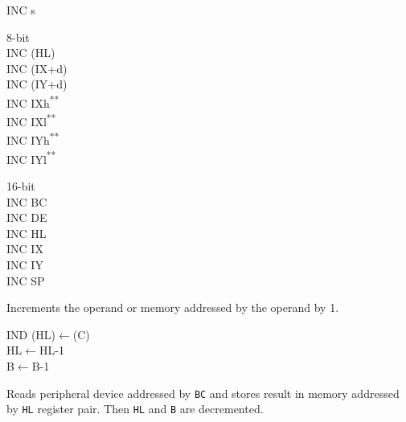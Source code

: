 \documentclass[12pt,twoside,openright,a4paper]{book}
\newcommand{\UNDOC}{\textnormal{\textsuperscript{**}}}
\begin{document}
\begin{basedescript}{
	\desclabelstyle{\multilinelabel}
	\desclabelwidth{3cm}}
\begin{detailitem}{INC s}
\begin{DetailVariants}
			\textnormal{8-bit}\\
			INC (HL)\\
			INC (IX+d)\\
			INC (IY+d)\\
			INC IXh\UNDOC\\
			INC IXl\UNDOC\\
			INC IYh\UNDOC\\
			INC IYl\UNDOC

			\textnormal{16-bit}\\
			INC BC\\
			INC DE\\
			INC HL\\
			INC IX\\
			INC IY\\
			INC SP
		\end{DetailVariants}

		Increments the operand or memory addressed by the operand by 1.

		\begin{DetailEffects}[v]
		\end{DetailEffects}
				
		\begin{DetailTiming}
		\end{DetailTiming}

	\end{detailitem}

 	\begin{detailitem}{IND}
		{(HL)$\leftarrow$(C)\\
		HL$\leftarrow$HL-1\\
		B$\leftarrow$B-1}

		Reads peripheral device addressed by {\tt BC} and stores result in memory addressed by {\tt HL} register pair. Then {\tt HL} and {\tt B} are decremented.

		\begin{DetailEffects}
		\end{DetailEffects}
				

\end{detailitem}
\end{basedescript}
\end{document}

